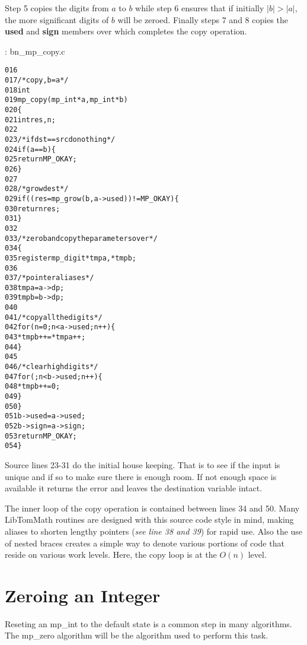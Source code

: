\documentclass[b5paper]{book}
\begin{document}
Step 5 copies the digits from $a$ to $b$ while step 6 ensures that if initially $\vert b \vert > \vert a \vert$,
the more significant digits of $b$ will be zeroed.  Finally steps 7 and 8 copies the \textbf{used} and \textbf{sign} members over 
which completes the copy operation.

\vspace{+3mm}\begin{small}
\hspace{-5.1mm}{\bf File}: bn\_mp\_copy.c
\vspace{-3mm}
\begin{alltt}
016   
017   /* copy, b = a */
018   int
019   mp_copy (mp_int * a, mp_int * b)
020   \{
021     int     res, n;
022   
023     /* if dst == src do nothing */
024     if (a == b) \{
025       return MP_OKAY;
026     \}
027   
028     /* grow dest */
029     if ((res = mp_grow (b, a->used)) != MP_OKAY) \{
030       return res;
031     \}
032   
033     /* zero b and copy the parameters over */
034     \{
035       register mp_digit *tmpa, *tmpb;
036   
037       /* pointer aliases */
038       tmpa = a->dp;
039       tmpb = b->dp;
040   
041       /* copy all the digits */
042       for (n = 0; n < a->used; n++) \{
043         *tmpb++ = *tmpa++;
044       \}
045   
046       /* clear high digits */
047       for (; n < b->used; n++) \{
048         *tmpb++ = 0;
049       \}
050     \}
051     b->used = a->used;
052     b->sign = a->sign;
053     return MP_OKAY;
054   \}
\end{alltt}
\end{small}

Source lines 23-31 do the initial house keeping.  That is to see if the input is unique and if so to 
make sure there is enough room.  If not enough space is available it returns the error and leaves the destination variable
intact.

The inner loop of the copy operation is contained between lines 34 and 50.  Many LibTomMath routines are designed with this source code style
in mind, making aliases to shorten lengthy pointers (\textit{see line 38 and 39}) for rapid use.  Also the
use of nested braces creates a simple way to denote various portions of code that reside on various work levels.  Here, the copy loop is at the 
$O(n)$ level.  

\section{Zeroing an Integer}
Reseting an mp\_int to the default state is a common step in many algorithms.  The mp\_zero algorithm will be the algorithm used to
perform this task.
\end{document}
